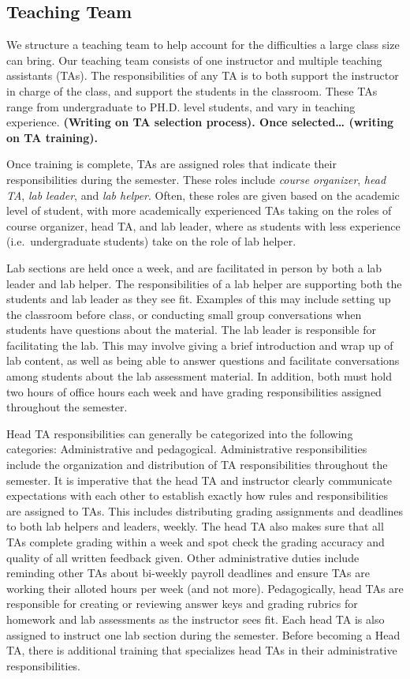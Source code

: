 \documentclass[
  12pt]{article}
\begin{document}
\hypertarget{teaching-team}{%
\subsection{Teaching Team}\label{teaching-team}}

We structure a teaching team to help account for the difficulties a
large class size can bring. Our teaching team consists of one instructor
and multiple teaching assistants (TAs). The responsibilities of any TA
is to both support the instructor in charge of the class, and support
the students in the classroom. These TAs range from undergraduate to
PH.D. level students, and vary in teaching experience. \textbf{(Writing
on TA selection process). Once selected\ldots{} (writing on TA
training).}

Once training is complete, TAs are assigned roles that indicate their
responsibilities during the semester. These roles include \emph{course
organizer}, \emph{head TA}, \emph{lab leader}, and \emph{lab helper}.
Often, these roles are given based on the academic level of student,
with more academically experienced TAs taking on the roles of course
organizer, head TA, and lab leader, where as students with less
experience (i.e.~undergraduate students) take on the role of lab helper.

Lab sections are held once a week, and are facilitated in person by both
a lab leader and lab helper. The responsibilities of a lab helper are
supporting both the students and lab leader as they see fit. Examples of
this may include setting up the classroom before class, or conducting
small group conversations when students have questions about the
material. The lab leader is responsible for facilitating the lab. This
may involve giving a brief introduction and wrap up of lab content, as
well as being able to answer questions and facilitate conversations
among students about the lab assessment material. In addition, both must
hold two hours of office hours each week and have grading
responsibilities assigned throughout the semester.

Head TA responsibilities can generally be categorized into the following
categories: Administrative and pedagogical. Administrative
responsibilities include the organization and distribution of TA
responsibilities throughout the semester. It is imperative that the head
TA and instructor clearly communicate expectations with each other to
establish exactly how rules and responsibilities are assigned to TAs.
This includes distributing grading assignments and deadlines to both lab
helpers and leaders, weekly. The head TA also makes sure that all TAs
complete grading within a week and spot check the grading accuracy and
quality of all written feedback given. Other administrative duties
include reminding other TAs about bi-weekly payroll deadlines and ensure
TAs are working their alloted hours per week (and not more).
Pedagogically, head TAs are responsible for creating or reviewing answer
keys and grading rubrics for homework and lab assessments as the
instructor sees fit. Each head TA is also assigned to instruct one lab
section during the semester. Before becoming a Head TA, there is
additional training that specializes head TAs in their administrative
responsibilities.
\end{document}
